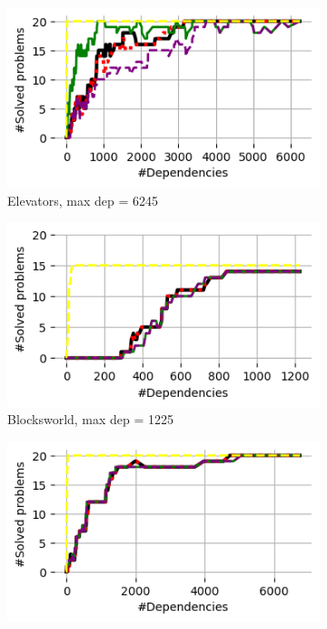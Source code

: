 \documentclass{article}
\theoremstyle{remark}
\begin{document}
\begin{figure}[t!]
\centering
\begin{subfigure}[b]{0.25\textwidth}
\centering
  \includegraphics[width=1\linewidth]{Results_graphs/MAFS/coverage_MAFS_Elevators}
  \caption{Elevators, max dep = 6245}
  \label{fig:ElevatorsMAFS}
\end{subfigure}\hspace{1em}
\begin{subfigure}[b]{0.25\textwidth}
\centering
  \includegraphics[width=1\linewidth]{Results_graphs/MAFS/coverage_MAFS_BlocksWorld}
  \caption{Blocksworld, max dep = 1225}
  \label{fig:BlocksworldMAFS}
\end{subfigure}\hspace{1em}
\begin{subfigure}[b]{0.25\textwidth}
\centering
  \includegraphics[width=1\linewidth]{Results_graphs/MAFS/coverage_MAFS_Depot}

\end{subfigure}
\end{figure}
\end{document}
